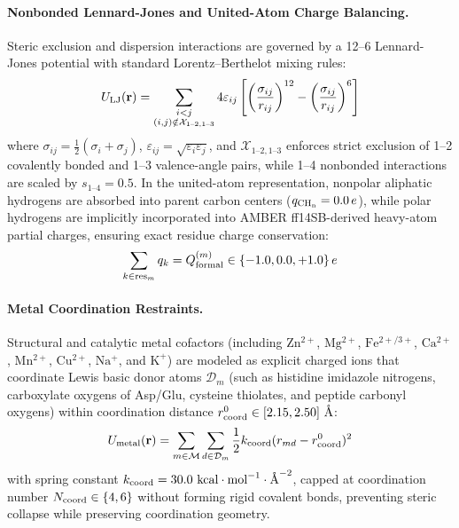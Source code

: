 \documentclass[journal=jpcbfk,manuscript=article,layout=twocolumn]{achemso}
\begin{document}
\paragraph{Nonbonded Lennard-Jones and United-Atom Charge Balancing.}
Steric exclusion and dispersion interactions are governed by a 12--6 Lennard-Jones potential with standard Lorentz--Berthelot mixing rules:\cite{weiner1984all}
\begin{equation}
U_{\rm LJ}(\mathbf{r}) = \sum_{\substack{i < j \\ (i,j) \notin \mathcal{X}_{1\text{--}2, 1\text{--}3}}} 4 \varepsilon_{ij} \left[ \left(\frac{\sigma_{ij}}{r_{ij}}\right)^{12} - \left(\frac{\sigma_{ij}}{r_{ij}}\right)^6 \right]
\end{equation}
where $\sigma_{ij} = \frac{1}{2}(\sigma_i + \sigma_j)$, $\varepsilon_{ij} = \sqrt{\varepsilon_i \varepsilon_j}$, and $\mathcal{X}_{1\text{--}2, 1\text{--}3}$ enforces strict exclusion of 1--2 covalently bonded and 1--3 valence-angle pairs, while 1--4 nonbonded interactions are scaled by $s_{1\text{--}4} = 0.5$. In the united-atom representation, nonpolar aliphatic hydrogens are absorbed into parent carbon centers ($q_{\rm CH_n} = 0.0\,e$), while polar hydrogens are implicitly incorporated into AMBER ff14SB-derived heavy-atom partial charges, ensuring exact residue charge conservation:\cite{case2005amber,maier2015ff14sb}
\begin{equation}
\sum_{k \in {\rm res}_m} q_k = Q_{\rm formal}^{(m)} \in \{-1.0, 0.0, +1.0\}\,e
\end{equation}

\paragraph{Metal Coordination Restraints.}
Structural and catalytic metal cofactors (including $\mathrm{Zn^{2+}}$, $\mathrm{Mg^{2+}}$, $\mathrm{Fe^{2+/3+}}$, $\mathrm{Ca^{2+}}$, $\mathrm{Mn^{2+}}$, $\mathrm{Cu^{2+}}$, $\mathrm{Na^+}$, and $\mathrm{K^+}$) are modeled as explicit charged ions that coordinate Lewis basic donor atoms $\mathcal{D}_m$ (such as histidine imidazole nitrogens, carboxylate oxygens of Asp/Glu, cysteine thiolates, and peptide carbonyl oxygens) within coordination distance $r_{\rm coord}^0 \in [2.15, 2.50]\text{ \AA}$:\cite{case2005amber}
\begin{equation}
U_{\rm metal}(\mathbf{r}) = \sum_{m \in \mathcal{M}} \sum_{d \in \mathcal{D}_m} \frac{1}{2} k_{\rm coord} (r_{md} - r_{\rm coord}^0)^2
\end{equation}
with spring constant $k_{\rm coord} = 30.0\text{ kcal}\cdot\text{mol}^{-1}\cdot\text{\AA}^{-2}$, capped at coordination number $N_{\rm coord} \in \{4, 6\}$ without forming rigid covalent bonds, preventing steric collapse while preserving coordination geometry.
\end{document}
